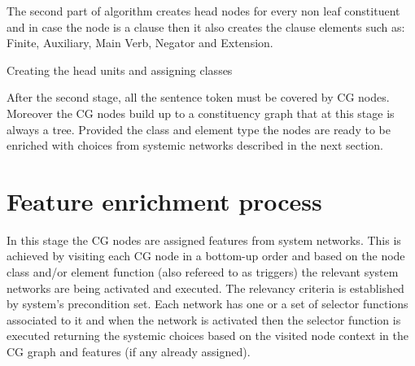 The second part of algorithm creates head nodes for every non leaf constituent and in case the node is a clause then it also creates the clause elements such as: Finite, Auxiliary, Main Verb, Negator and Extension.

\begin{algorithm}[!ht]
\Input {\cg, \dg}
\caption{Creating the head units and assigning classes}
\label{alg:phase-two}
\end{algorithm}

After the second stage, all the sentence token must be covered by CG nodes. Moreover the CG nodes build up to a constituency graph that at this stage is always a tree. Provided the class and element type the nodes are ready to be enriched with choices from systemic networks described in the next section. 

\section{Feature enrichment process}
\label{sec:enrichment-stage}
In this stage the CG nodes are assigned features from system networks. This is achieved by visiting each CG node in a bottom-up order and based on the node class and/or element function (also refereed to as triggers) the relevant system networks are being activated and executed. The relevancy criteria is established by system's precondition set. Each network has one or a set of selector functions associated to it and when the network is activated then the selector function is executed returning the systemic choices based on the visited node context in the CG graph and features (if any already assigned).

